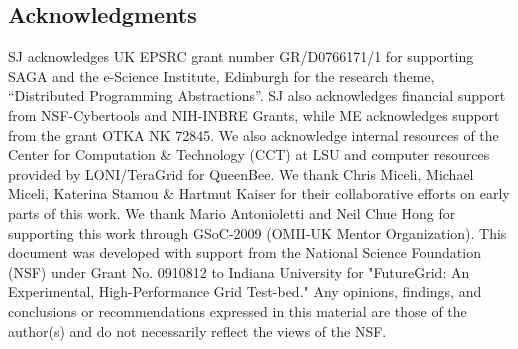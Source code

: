 \documentclass[3p,twocolumn]{elsarticle}
\begin{document}





\subsection*{Acknowledgments}

\small{SJ acknowledges UK EPSRC grant number GR/D0766171/1 for
  supporting SAGA and the e-Science Institute, Edinburgh for the
  research theme, ``Distributed Programming Abstractions''.  SJ also
  acknowledges financial support from NSF-Cybertools and NIH-INBRE
  Grants, while ME acknowledges support from the grant OTKA NK 72845.
  We also acknowledge internal resources of the Center for Computation
  \& Technology (CCT) at LSU and computer resources provided by
  LONI/TeraGrid for QueenBee.  We thank Chris Miceli, Michael Miceli,
  Katerina Stamou \& Hartmut Kaiser for their collaborative efforts on
  early parts of this work. We thank Mario Antonioletti and Neil Chue
  Hong for supporting this work through GSoC-2009 (OMII-UK Mentor
  Organization). This document was developed with support from the
  National Science Foundation (NSF) under Grant No. 0910812 to Indiana
  University for "FutureGrid: An Experimental, High-Performance Grid
  Test-bed." Any opinions, findings, and conclusions or
  recommendations expressed in this material are those of the
  author(s) and do not necessarily reflect the views of the NSF.}



\end{document}
